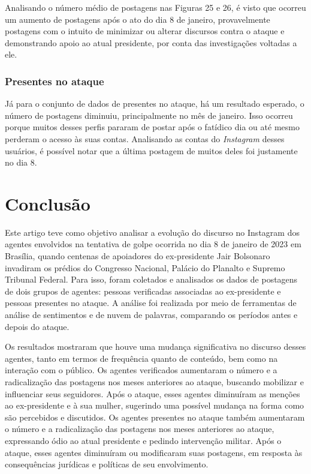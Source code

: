 \documentclass[manuscript,screen,review]{acmart}
\begin{document}
Analisando o número médio de postagens nas Figuras 25 e 26, é visto que ocorreu um aumento de postagens após o ato do dia 8 de janeiro, provavelmente postagens com o intuito de minimizar ou alterar discursos contra o ataque e demonstrando apoio ao atual presidente, por conta das investigações voltadas a ele.

\subsubsection{Presentes no ataque}

Já para o conjunto de dados de presentes no ataque, há um resultado esperado, o número de postagens diminuiu, principalmente no mês de janeiro. Isso ocorreu porque muitos desses perfis pararam de postar após o fatídico dia ou até mesmo perderam o acesso às suas contas. Analisando as contas do \textit{Instagram} desses usuários, é possível notar que a última postagem de muitos deles foi justamente no dia 8.

\section{Conclusão}

Este artigo teve como objetivo analisar a evolução do discurso no Instagram dos agentes envolvidos na tentativa de golpe ocorrida no dia 8 de janeiro de 2023 em Brasília, quando centenas de apoiadores do ex-presidente Jair Bolsonaro invadiram os prédios do Congresso Nacional, Palácio do Planalto e Supremo Tribunal Federal. Para isso, foram coletados e analisados os dados de postagens de dois grupos de agentes: pessoas verificadas associadas ao ex-presidente e pessoas presentes no ataque. A análise foi realizada por meio de ferramentas de análise de sentimentos e de nuvem de palavras, comparando os períodos antes e depois do ataque.

Os resultados mostraram que houve uma mudança significativa no discurso desses agentes, tanto em termos de frequência quanto de conteúdo, bem como na interação com o público. Os agentes verificados aumentaram o número e a radicalização das postagens nos meses anteriores ao ataque, buscando mobilizar e influenciar seus seguidores. Após o ataque, esses agentes diminuíram as menções ao ex-presidente e à sua mulher, sugerindo uma possível mudança na forma como são percebidos e discutidos. Os agentes presentes no ataque também aumentaram o número e a radicalização das postagens nos meses anteriores ao ataque, expressando ódio ao atual presidente e pedindo intervenção militar. Após o ataque, esses agentes diminuíram ou modificaram suas postagens, em resposta às consequências jurídicas e políticas de seu envolvimento.
\end{document}
